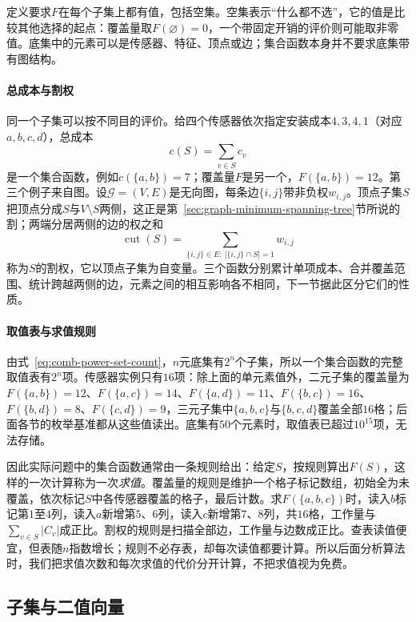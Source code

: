 定义要求$F$在每个子集上都有值，包括空集。空集表示“什么都不选”，它的值是比较其他选择的起点：覆盖量取$F(\varnothing)=0$，一个带固定开销的评价则可能取非零值。底集中的元素可以是传感器、特征、顶点或边；集合函数本身并不要求底集带有图结构。

\paragraph{总成本与割权}
同一个子集可以按不同目的评价。给四个传感器依次指定安装成本$4,3,4,1$（对应$a,b,c,d$），总成本
\[
  c(S)=\sum_{v\in S}c_v
\]
是一个集合函数，例如$c(\{a,b\})=7$；覆盖量$F$是另一个，$F(\{a,b\})=12$。第三个例子来自图。设$\mathcal G=(V,E)$是无向图，每条边$\{i,j\}$带非负权$w_{i,j}$。顶点子集$S$把顶点分成$S$与$V\setminus S$两侧，这正是第~\ref{sec:graph-minimum-spanning-tree}节所说的割；两端分居两侧的边的权之和
\[
  \operatorname{cut}(S)=\sum_{\{i,j\}\in E:\ |\{i,j\}\cap S|=1}w_{i,j}
\]
称为$S$的割权，它以顶点子集为自变量。三个函数分别累计单项成本、合并覆盖范围、统计跨越两侧的边，元素之间的相互影响各不相同，下一节据此区分它们的性质。

\paragraph{取值表与求值规则}
由式~\eqref{eq:comb-power-set-count}，$n$元底集有$2^n$个子集，所以一个集合函数的完整取值表有$2^n$项。传感器实例只有$16$项：除上面的单元素值外，二元子集的覆盖量为$F(\{a,b\})=12$、$F(\{a,c\})=14$、$F(\{a,d\})=11$、$F(\{b,c\})=16$、$F(\{b,d\})=8$、$F(\{c,d\})=9$，三元子集中$\{a,b,c\}$与$\{b,c,d\}$覆盖全部$16$格；后面各节的枚举基准都从这些值读出。底集有$50$个元素时，取值表已超过$10^{15}$项，无法存储。

因此实际问题中的集合函数通常由一条规则给出：给定$S$，按规则算出$F(S)$，这样的一次计算称为一次\emph{求值}。覆盖量的规则是维护一个格子标记数组，初始全为未覆盖，依次标记$S$中各传感器覆盖的格子，最后计数。求$F(\{a,b,c\})$时，读入$b$标记第$1$至$4$列，读入$a$新增第$5$、$6$列，读入$c$新增第$7$、$8$列，共$16$格，工作量与$\sum_{v\in S}|C_v|$成正比。割权的规则是扫描全部边，工作量与边数成正比。查表读值便宜，但表随$n$指数增长；规则不必存表，却每次读值都要计算。所以后面分析算法时，我们把求值次数和每次求值的代价分开计算，不把求值视为免费。

\subsection{子集与二值向量}
\label{sec:graph-setfn-binary-vectors}

